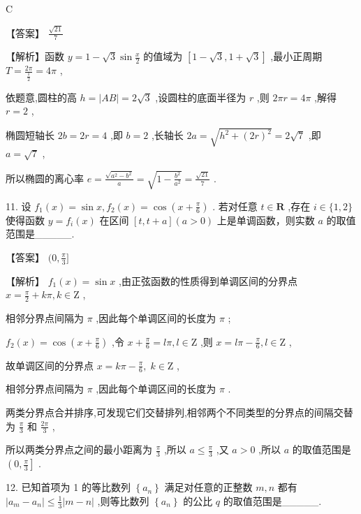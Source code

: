 \documentclass[10pt]{article}
\begin{document}
C

【答案】 \(\frac{\sqrt{21}}{7}\)

【解析】函数 \(y = 1 - \sqrt{3}\sin \frac{x}{2}\) 的值域为 \(\left\lbrack  {1 - \sqrt{3},1 + \sqrt{3}}\right\rbrack\) ,最小正周期 \(T = \frac{2\pi }{\frac{1}{2}} = {4\pi }\) ,

依题意,圆柱的高 \(h = \left| {AB}\right|  = 2\sqrt{3}\) ,设圆柱的底面半径为 \(r\) ,则 \({2\pi r} = {4\pi }\) ,解得 \(r = 2\) ,

椭圆短轴长 \({2b} = {2r} = 4\) ,即 \(b = 2\) ,长轴长 \({2a} = \sqrt{{h}^{2} + {\left( 2r\right) }^{2}} = 2\sqrt{7}\) ,即 \(a = \sqrt{7}\) ,

所以椭圆的离心率 \(e = \frac{\sqrt{{a}^{2} - {b}^{2}}}{a} = \sqrt{1 - \frac{{b}^{2}}{{a}^{2}}} = \frac{\sqrt{21}}{7}\) .

11. 设 \({f}_{1}\left( x\right)  = \sin x,{f}_{2}\left( x\right)  = \cos \left( {x + \frac{\pi }{6}}\right)\) . 若对任意 \(t \in  \mathbf{R}\) ,存在 \(i \in  \{ 1,2\}\) 使得函数 \(y = {f}_{i}\left( x\right)\) 在区间 \(\left\lbrack  {t,t + a}\right\rbrack  \left( {a > 0}\right)\) 上是单调函数，则实数 \(a\) 的取值范围是\_\_\_\_\_.

【答案】 \((0,\frac{\pi }{3}\rbrack\)

【解析】 \({f}_{1}\left( x\right)  = \sin x\) ,由正弦函数的性质得到单调区间的分界点 \(x = \frac{\pi }{2} + {k\pi },k \in  \mathrm{Z}\) ,

相邻分界点间隔为 \(\pi\) ,因此每个单调区间的长度为 \(\pi\) ;

\({f}_{2}\left( x\right)  = \cos \left( {x + \frac{\pi }{6}}\right)\) ,令 \(x + \frac{\pi }{6} = {l\pi },l \in  \mathrm{Z}\) ,则 \(x = {l\pi } - \frac{\pi }{6},l \in  \mathrm{Z}\) ,

故单调区间的分界点 \(x = {k\pi } - \frac{\pi }{6},\;k \in  \mathrm{Z}\) ,

相邻分界点间隔为 \(\pi\) ,因此每个单调区间的长度为 \(\pi\) .

两类分界点合并排序,可发现它们交替排列,相邻两个不同类型的分界点的间隔交替为 \(\frac{\pi }{3}\) 和 \(\frac{2\pi }{3}\) ,

所以两类分界点之间的最小距离为 \(\frac{\pi }{3}\) ,所以 \(a \leq  \frac{\pi }{3}\) ,又 \(a > 0\) ,所以 \(a\) 的取值范围是 \(\left( {0,\frac{\pi }{3}}\right\rbrack\) .

12. 已知首项为 1 的等比数列 \(\left\{  {a}_{n}\right\}\) 满足对任意的正整数 \(m,n\) 都有 \(\left| {{a}_{m} - {a}_{n}}\right|  \leq  \frac{1}{3}\left| {m - n}\right|\) ,则等比数列 \(\left\{  {a}_{n}\right\}\) 的公比 \(q\) 的取值范围是\_\_\_\_\_.
\end{document}

